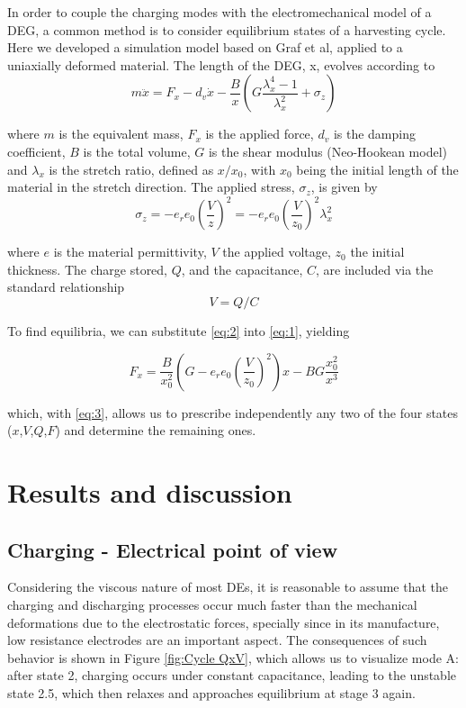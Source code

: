 In order to couple the charging modes with the electromechanical model of a DEG, a common method is to consider equilibrium states of a harvesting cycle\cite{Shian2014OptimizingGenerators,RN73,RN32}. Here we developed a simulation model based on Graf et al\cite{RN73}, applied to a uniaxially deformed material. The length of the DEG, x, evolves according to
\begin{equation} \label{eq:1}
m \ddot{x} = F_x- d_v \dot{x} -  \frac{B}{x} \left( G \frac{\lambda_x^4-1}{\lambda_x^2} +\sigma_z \right)
\end{equation}


where $m$ is the equivalent mass, $F_x$ is the applied force, $d_v$ is the damping coefficient, $B$ is the total volume, $G$ is the shear modulus (Neo-Hookean model) and $\lambda_x$ is the stretch ratio, defined as $x/x_0$, with $x_0$ being the initial length of the material in the stretch direction. The applied stress, $\sigma_z$, is given by
\begin{equation} \label{eq:2}
\sigma_z = -e_r e_0 \left(\frac{V}{z}\right)^2 = -e_r e_0 \left(\frac{V}{z_0} \right)^2 \lambda_x^2
\end{equation}


where $e$ is the material permittivity, $V$ the applied voltage, $z_0$ the initial thickness. The charge stored, $Q$, and the capacitance, $C$, are included via the standard relationship
\begin{equation} \label{eq:3}
V=Q/C
\end{equation}

To find equilibria, we can substitute \ref{eq:2} into \ref{eq:1}, yielding

\begin{equation} \label{eq:4}
F_x =   \frac{B}{x_0^2}  \left(G-e_r e_0 \left(\frac{V}{z_0} \right)^2 \right)x-B G \frac{x_0^2}{x^3}  
\end{equation}

which, with \ref{eq:3}, allows us to prescribe independently any two of the four states ($x$,$V$,$Q$,$F$) and determine the remaining ones.

\section{Results and discussion}
\label{sec:results}

\subsection{Charging - Electrical point of view}
\label{subsec:charging}
Considering the viscous nature of most DEs, it is reasonable to assume that the charging and discharging processes occur much faster than the mechanical deformations due to the electrostatic forces, specially since in its manufacture, low resistance electrodes are an important aspect. The consequences of such behavior is shown in Figure \ref{fig:Cycle QxV}, which allows us to visualize mode A: after state 2, charging occurs under constant capacitance, leading to the unstable state 2.5\textquotesingle, which then relaxes and approaches equilibrium at stage 3 again.

